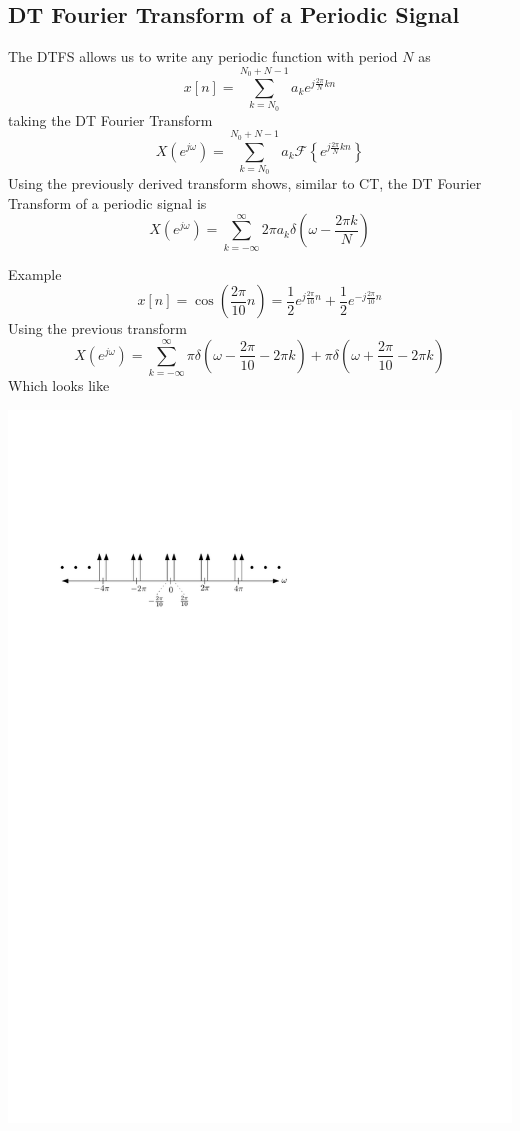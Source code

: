 \subsection{DT Fourier Transform of a Periodic Signal}

The DTFS allows us to write any periodic function with period $N$ as
\[
x[n] = \sum\limits_{k = N_0}^{N_0 + N -1} a_k e^{j\frac{2\pi}{N}kn}  
\]
taking the DT Fourier Transform 
\[
X\left(e^{j\omega}\right) = \sum\limits_{k = N_0}^{N_0 + N -1} a_k \mathcal{F}\left\{e^{j\frac{2\pi}{N}kn}\right\}
\]
Using the previously derived transform shows, similar to CT, the DT Fourier Transform of a periodic signal is 
\[
X\left(e^{j\omega}\right) = \sum\limits_{k = -\infty}^{\infty} 2\pi a_k \delta\left(\omega - \frac{2\pi k}{N}\right)  
\]

Example
  \[
  x[n] = \cos\left(\frac{2\pi}{10} n\right) = \frac{1}{2}e^{j\frac{2\pi}{10} n} + \frac{1}{2}e^{-j\frac{2\pi}{10} n}
  \]
  Using the previous transform
  \[
  X\left(e^{j\omega}\right) =  \sum\limits_{k = -\infty}^{\infty} \pi \delta\left(\omega - \frac{2\pi}{10} -2\pi k\right) + \pi \delta\left(\omega + \frac{2\pi}{10} -2\pi k\right)
  \]
  Which looks like
  \begin{center}
  \includegraphics[scale=1]{graphics/dtft-periodic-ex2.pdf}
\end{center}
